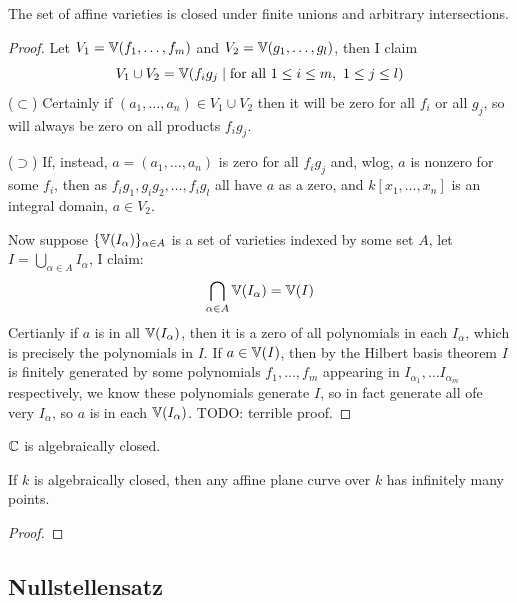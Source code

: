 \documentclass{article}
\begin{document}
\begin{lemma}
    The set of affine varieties is closed under finite unions and arbitrary intersections.\begin{proof}
        Let $V_1=\mathbb{V}(f_1,\ldots,f_m)$ and $V_2=\mathbb{V}(g_1,\ldots,g_l)$, then I claim \[
        V_1\cup V_2 = \mathbb{V}(f_ig_j \mid \text{for all } 1\leq i\leq m, \ 1\leq j\leq l)
        \]
        ($\subset$) Certainly if $(a_1,\ldots,a_n)\in V_1\cup V_2$ then it will be zero for all $f_i$ or all $g_j$, so will always be zero on all products $f_ig_j$.

        ($\supset$) If, instead, $a=(a_1,\ldots,a_n)$ is zero for all $f_ig_j$ and, wlog, $a$ is nonzero for some $f_i$, then as $f_ig_1,g_ig_2,\ldots,f_ig_l$ all have $a$ as a zero, and $k[x_1,\ldots,x_n]$ is an integral domain, $a\in V_2$.

        Now suppose $\{\mathbb{V}(I_\alpha)\}_{\alpha\in A}$ is a set of varieties indexed by some set $A$, let $I=\bigcup_{\alpha\in A}I_\alpha$, I claim: \[
        \bigcap_{\alpha\in A}\mathbb{V}(I_\alpha) = \mathbb{V}(I)
        \] Certianly if $a$ is in all $\mathbb{V}(I_\alpha)$, then it is a zero of all polynomials in each $I_\alpha$, which is precisely the polynomials in $I$. If $a\in\mathbb{V}(I)$, then by the Hilbert basis theorem $I$ is finitely generated by some polynomials $f_1,\ldots,f_m$ appearing in $I_{\alpha_1},\ldots I_{\alpha_m}$ respectively, we know these polynomials generate $I$, so in fact generate all ofe very $I_\alpha$, so $a$ is in each $\mathbb{V}(I_\alpha)$. TODO: terrible proof.
    \end{proof}
\end{lemma}

\begin{theorem}
    $\mathbb{C}$ is algebraically closed.
\end{theorem}

\begin{proposition}
    If $k$ is algebraically closed, then any affine plane curve over $k$ has infinitely many points.\begin{proof}
        
    \end{proof}
\end{proposition}

\subsection{Nullstellensatz}
\end{document}
